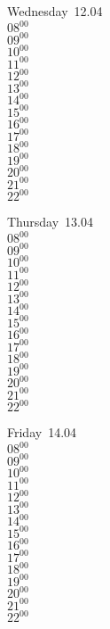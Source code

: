 \documentclass[11pt,a4paper]{book}\usepackage[]{graphicx}\usepackage[]{color}
\begin{document}
\begin{weekdaybox}
  Wednesday~12.04\\
  { 
  \vfill
  $08^{00}$\\
$09^{00}$\\
$10^{00}$\\
$11^{00}$\\
$12^{00}$\\
$13^{00}$\\
$14^{00}$\\
$15^{00}$\\
$16^{00}$\\
$17^{00}$\\
$18^{00}$\\
$19^{00}$\\
$20^{00}$\\
$21^{00}$\\
$22^{00}$\\
  }
\end{weekdaybox}
\clearpage
\begin{headerbox}
\end{headerbox}
\begin{weekdaybox}
  Thursday~13.04\\
  { 
  \vfill
  $08^{00}$\\
$09^{00}$\\
$10^{00}$\\
$11^{00}$\\
$12^{00}$\\
$13^{00}$\\
$14^{00}$\\
$15^{00}$\\
$16^{00}$\\
$17^{00}$\\
$18^{00}$\\
$19^{00}$\\
$20^{00}$\\
$21^{00}$\\
$22^{00}$\\
  }
\end{weekdaybox} 
\begin{weekdaybox}
  Friday~14.04\\
  { 
  \vfill
  $08^{00}$\\
$09^{00}$\\
$10^{00}$\\
$11^{00}$\\
$12^{00}$\\
$13^{00}$\\
$14^{00}$\\
$15^{00}$\\
$16^{00}$\\
$17^{00}$\\
$18^{00}$\\
$19^{00}$\\
$20^{00}$\\
$21^{00}$\\
$22^{00}$\\
  }
\end{weekdaybox}
\end{document}
